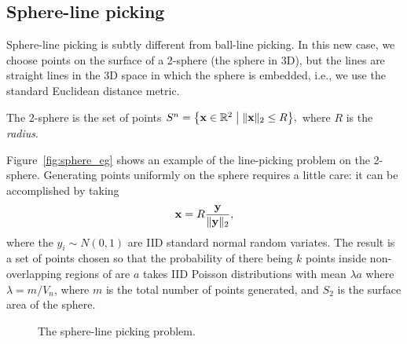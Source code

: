 \subsection{Sphere-line picking}
\label{sec:sphere_line}

Sphere-line picking is subtly different from ball-line picking. In
this new case, we choose points on the surface of a 2-sphere (the
sphere in 3D), but the lines are straight lines in the 3D space in
which the sphere is embedded, i.e., we use the standard Euclidean
distance metric.

The $2$-sphere is the set of points $S^n = \big\{ {\mathbf x} \in \mathbb{R}^2
\; \big| \; \|{\mathbf x} \|_2 \leq R \big\},$ where $R$ is the {\em
  radius}.

Figure~\ref{fig:sphere_eg} shows an example of the line-picking
problem on the 2-sphere. Generating points uniformly on the sphere
requires a little care: it can be accomplished by taking
\cite{marsaglia72:_choos_point_surfac_spher}
\begin{equation}
    \label{eq:x_surface_sphere2}
    {\mathbf x} = R \frac{{\mathbf y}}{\| {\mathbf y} \|_2}, 
\end{equation}
where the $y_i \sim N(0,1)$ are IID standard normal random variates.
The result is a set of points chosen so that the probability of there
being $k$ points inside non-overlapping regions of are $a$ takes
IID Poisson distributions with mean $\lambda a$ where $\lambda =
m/V_n$, where $m$ is the total number of points generated, and $S_2$
is the surface area of the sphere.

\begin{figure}[tbp]
  \begin{center}
    \hspace{6mm}
    \caption{The sphere-line picking problem.}
  \end{center} 
\vspace{-4mm}
\end{figure}

